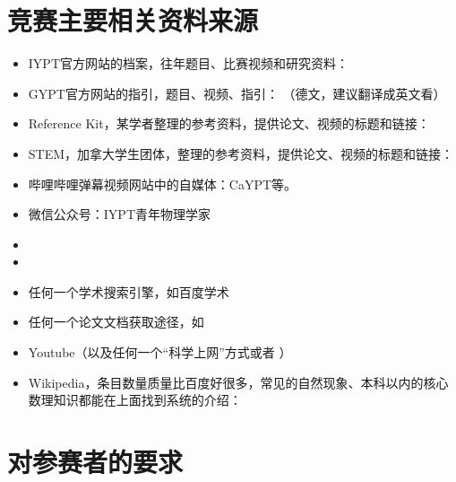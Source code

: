 \documentclass[a4paper,10pt,english]{sphinxmanual}
\begin{document}
\section{竞赛主要相关资料来源}
\label{\detokenize{2. Intro_Tournament:id5}}\begin{itemize}
\item {} 
IYPT官方网站的档案，往年题目、比赛视频和研究资料：

\item {} 
GYPT官方网站的指引，题目、视频、指引： （德文，建议翻译成英文看）

\item {} 
Reference Kit，某学者整理的参考资料，提供论文、视频的标题和链接： 

\item {} 
STEM，加拿大学生团体，整理的参考资料，提供论文、视频的标题和链接：

\item {} 
哔哩哔哩弹幕视频网站中的自媒体：CaYPT等。

\item {} 
微信公众号：IYPT青年物理学家

\item {} 

\item {} 

\item {} 
任何一个学术搜索引擎，如百度学术

\item {} 
任何一个论文文档获取途径，如 

\item {} 
Youtube（以及任何一个“科学上网”方式或者  ）

\item {} 
Wikipedia，条目数量质量比百度好很多，常见的自然现象、本科以内的核心数理知识都能在上面找到系统的介绍：

\end{itemize}


\section{对参赛者的要求}
\label{\detokenize{2. Intro_Tournament:id7}}
\end{document}
